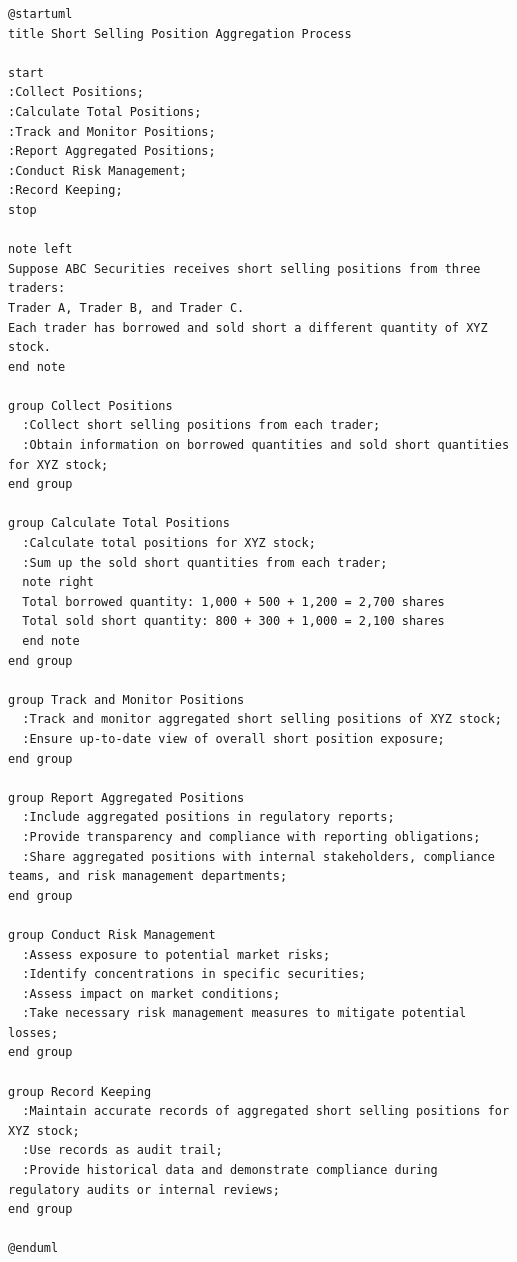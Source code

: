 \documentclass[11pt]{article}
\begin{document}
\begin{verbatim}
@startuml
title Short Selling Position Aggregation Process

start
:Collect Positions;
:Calculate Total Positions;
:Track and Monitor Positions;
:Report Aggregated Positions;
:Conduct Risk Management;
:Record Keeping;
stop

note left
Suppose ABC Securities receives short selling positions from three traders:
Trader A, Trader B, and Trader C.
Each trader has borrowed and sold short a different quantity of XYZ stock.
end note

group Collect Positions
  :Collect short selling positions from each trader;
  :Obtain information on borrowed quantities and sold short quantities for XYZ stock;
end group

group Calculate Total Positions
  :Calculate total positions for XYZ stock;
  :Sum up the sold short quantities from each trader;
  note right
  Total borrowed quantity: 1,000 + 500 + 1,200 = 2,700 shares
  Total sold short quantity: 800 + 300 + 1,000 = 2,100 shares
  end note
end group

group Track and Monitor Positions
  :Track and monitor aggregated short selling positions of XYZ stock;
  :Ensure up-to-date view of overall short position exposure;
end group

group Report Aggregated Positions
  :Include aggregated positions in regulatory reports;
  :Provide transparency and compliance with reporting obligations;
  :Share aggregated positions with internal stakeholders, compliance teams, and risk management departments;
end group

group Conduct Risk Management
  :Assess exposure to potential market risks;
  :Identify concentrations in specific securities;
  :Assess impact on market conditions;
  :Take necessary risk management measures to mitigate potential losses;
end group

group Record Keeping
  :Maintain accurate records of aggregated short selling positions for XYZ stock;
  :Use records as audit trail;
  :Provide historical data and demonstrate compliance during regulatory audits or internal reviews;
end group

@enduml
\end{verbatim}
\end{document}
